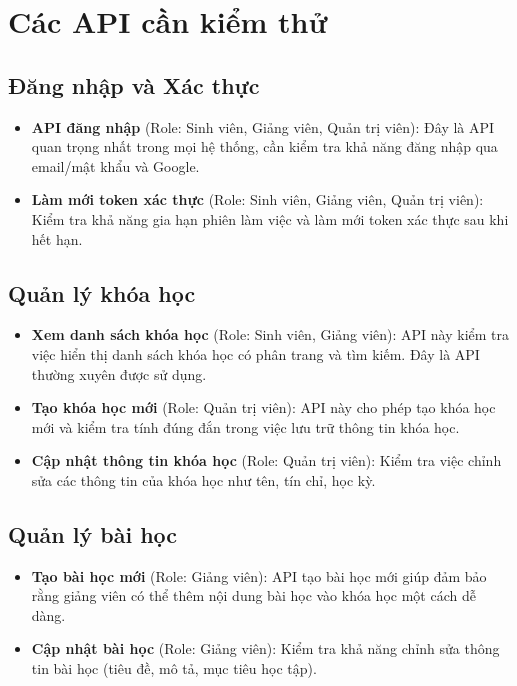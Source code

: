 \section{Các API cần kiểm thử}
\subsection{Đăng nhập và Xác thực}
\begin{itemize}
    \item \textbf{API đăng nhập} (Role: Sinh viên, Giảng viên, Quản trị viên): Đây là API quan trọng nhất trong mọi hệ thống, cần kiểm tra khả năng đăng nhập qua email/mật khẩu và Google.
    \item \textbf{Làm mới token xác thực} (Role: Sinh viên, Giảng viên, Quản trị viên): Kiểm tra khả năng gia hạn phiên làm việc và làm mới token xác thực sau khi hết hạn.
\end{itemize}

\subsection{Quản lý khóa học}
\begin{itemize}
    \item \textbf{Xem danh sách khóa học} (Role: Sinh viên, Giảng viên): API này kiểm tra việc hiển thị danh sách khóa học có phân trang và tìm kiếm. Đây là API thường xuyên được sử dụng.
    \item \textbf{Tạo khóa học mới} (Role: Quản trị viên): API này cho phép tạo khóa học mới và kiểm tra tính đúng đắn trong việc lưu trữ thông tin khóa học.
    \item \textbf{Cập nhật thông tin khóa học} (Role: Quản trị viên): Kiểm tra việc chỉnh sửa các thông tin của khóa học như tên, tín chỉ, học kỳ.
\end{itemize}

\subsection{Quản lý bài học}
\begin{itemize}
    \item \textbf{Tạo bài học mới} (Role: Giảng viên): API tạo bài học mới giúp đảm bảo rằng giảng viên có thể thêm nội dung bài học vào khóa học một cách dễ dàng.
    \item \textbf{Cập nhật bài học} (Role: Giảng viên): Kiểm tra khả năng chỉnh sửa thông tin bài học (tiêu đề, mô tả, mục tiêu học tập).
\end{itemize}

